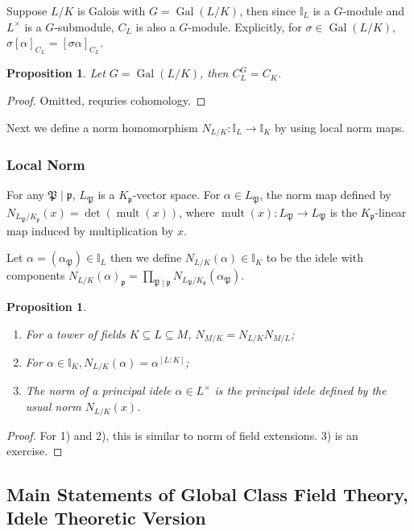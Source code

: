 \documentclass[11pt]{article}
\theoremstyle{definition}
\theoremstyle{plain}
\newtheorem{proposition}[definition]{Proposition}
\theoremstyle{remark}
\DeclareMathOperator{\Gal}{Gal}
\DeclareMathOperator{\mult}{mult}
\newcommand{\II}{\mathbb{I}}
\newcommand{\cp}{\mathfrak{P}}
\newcommand{\fp}{\mathfrak{p}}
\begin{document}
Suppose $L/K$ is Galois with $G = \Gal(L/K)$, then since $\II_L$ is a $G$-module and $L^\times$ is a $G$-submodule, $C_L$ is also a $G$-module. Explicitly, for $\sigma \in \Gal(L/K)$, $\sigma [\alpha]_{C_L} = [\sigma \alpha]_{C_L}$.

\begin{proposition}
    Let $G = \Gal(L/K)$, then $C_L^G = C_K$.
\end{proposition}
\begin{proof}
    Omitted, requries cohomology.
\end{proof}

Next we define a norm homomorphism $N_{L/K} : \II_L \to \II_K$ by using local norm maps.

\subsubsection*{Local Norm}
For any $\cp \mid \fp$, $L_\cp$ is a $K_\fp$-vector space. For $\alpha \in L_\cp$, the norm map defined by $N_{L_\cp/K_\fp}(x) = \det(\mult(x))$, where $\mult(x) : L_\cp \to L_\cp$ is the $K_\fp$-linear map induced by multiplication by $x$.

Let $\alpha = (\alpha_\cp) \in \II_L$ then we define $N_{L/K}(\alpha) \in \II_K$ to be the idele with components $N_{L/K}(\alpha)_\fp = \prod_{\cp \mid \fp} N_{L_\cp / K_\fp}(\alpha_\cp)$.

\begin{proposition}\label{prop:9_21}\phantom{}
    \begin{enumerate}
        \item For a tower of fields $K \subseteq L \subseteq M$, $N_{M/K} = N_{L/K} N_{M/L}$;
        \item For $\alpha \in \II_K, N_{L/K}(\alpha) = \alpha^{[L:K]}$;
        \item The norm of a principal idele $\alpha \in L^\times$ is the principal idele defined by the usual norm $N_{L/K}(x)$.
    \end{enumerate}
\end{proposition}
\begin{proof}
    For 1) and 2), this is similar to norm of field extensions. 3) is an exercise.
\end{proof}

\subsection{Main Statements of Global Class Field Theory, Idele Theoretic Version}
\end{document}

